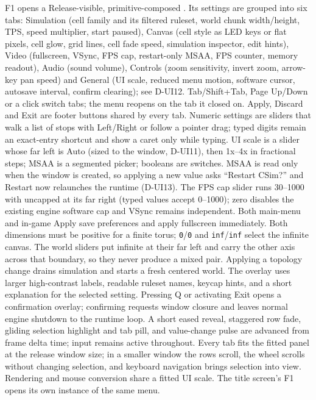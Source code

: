 F1 opens a Release-visible, primitive-composed .
Its settings are grouped into six tabs: Simulation (cell family and its
filtered ruleset, world chunk width/height, TPS, speed multiplier, start
paused), Canvas (cell style as LED keys or flat pixels, cell glow, grid lines,
cell fade speed, simulation inspector, edit hints), Video (fullscreen, VSync,
FPS cap, restart-only MSAA, FPS counter, memory readout), Audio (sound
volume), Controls (zoom sensitivity, invert zoom, arrow-key pan speed) and
General (UI scale, reduced menu motion, software cursor, autosave interval,
confirm clearing); see D-UI12. Tab/Shift+Tab, Page Up/Down or a click switch
tabs; the menu reopens on the tab it closed on. Apply, Discard and Exit are
footer buttons shared by every tab. Numeric settings are sliders that walk a
list of stops with Left/Right or follow a pointer drag; typed digits remain an
exact-entry shortcut and show a caret only while typing. UI scale is a slider
whose far left is Auto (sized to the window, D-UI11), then 1x--4x in
fractional steps; MSAA is a segmented picker; booleans are switches. MSAA is
read only when the window is created, so applying a new value asks ``Restart
CSim?'' and Restart now relaunches the runtime (D-UI13). The FPS cap slider runs 30--1000
with uncapped at its far right (typed values accept 0--1000); zero disables
the existing engine software cap and VSync remains independent. Both
main-menu and in-game Apply save preferences and apply fullscreen
immediately. Both dimensions must be positive for a finite torus;
\texttt{0}/\texttt{0} and \texttt{inf}/\texttt{inf} select the infinite
canvas. The world sliders put infinite at their far left and carry the other
axis across that boundary, so they never produce a mixed pair. Applying a
topology change drains simulation and starts a fresh centered world. The
overlay uses larger high-contrast labels, readable ruleset names, keycap
hints, and a short explanation for the selected setting. Pressing Q or
activating Exit opens a confirmation overlay; confirming requests window
closure and leaves normal engine shutdown to the runtime loop. A short eased
reveal, staggered row fade, gliding selection highlight and tab pill, and
value-change pulse are advanced from frame delta time; input remains active
throughout. Every tab fits the fitted panel at the release window size; in a
smaller window the rows scroll, the wheel scrolls without changing selection,
and keyboard navigation brings selection into view. Rendering and mouse
conversion share a fitted UI scale. The title screen's F1 opens its own
instance of the same menu.

